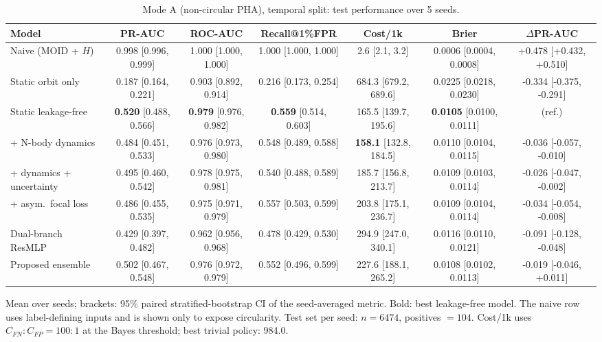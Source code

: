 \begin{table}[t]
\centering
\small
\caption{Mode A (non-circular PHA), temporal split: test performance over 5 seeds.}
\label{tab:pha_temporal_all}
\begin{tabular}{lcccccc}
\toprule
Model & PR-AUC & ROC-AUC & Recall@1\%FPR & Cost/1k & Brier & $\Delta$PR-AUC \\
\midrule
Naive (MOID + $H$) & 0.998 \scriptsize{[0.996, 0.999]} & 1.000 \scriptsize{[1.000, 1.000]} & 1.000 \scriptsize{[1.000, 1.000]} & 2.6 \scriptsize{[2.1, 3.2]} & 0.0006 \scriptsize{[0.0004, 0.0008]} & +0.478 \scriptsize{[+0.432, +0.510]} \\
\midrule
Static orbit only & 0.187 \scriptsize{[0.164, 0.221]} & 0.903 \scriptsize{[0.892, 0.914]} & 0.216 \scriptsize{[0.173, 0.254]} & 684.3 \scriptsize{[679.2, 689.6]} & 0.0225 \scriptsize{[0.0218, 0.0230]} & -0.334 \scriptsize{[-0.375, -0.291]} \\
Static leakage-free & \textbf{0.520} \scriptsize{[0.488, 0.566]} & \textbf{0.979} \scriptsize{[0.976, 0.982]} & \textbf{0.559} \scriptsize{[0.514, 0.603]} & 165.5 \scriptsize{[139.7, 195.6]} & \textbf{0.0105} \scriptsize{[0.0100, 0.0111]} & (ref.) \\
+ N-body dynamics & 0.484 \scriptsize{[0.451, 0.533]} & 0.976 \scriptsize{[0.973, 0.980]} & 0.548 \scriptsize{[0.489, 0.588]} & \textbf{158.1} \scriptsize{[132.8, 184.5]} & 0.0110 \scriptsize{[0.0104, 0.0115]} & -0.036 \scriptsize{[-0.057, -0.010]} \\
+ dynamics + uncertainty & 0.495 \scriptsize{[0.460, 0.542]} & 0.978 \scriptsize{[0.975, 0.981]} & 0.540 \scriptsize{[0.488, 0.589]} & 185.7 \scriptsize{[156.8, 213.7]} & 0.0109 \scriptsize{[0.0103, 0.0114]} & -0.026 \scriptsize{[-0.047, -0.002]} \\
+ asym.\ focal loss & 0.486 \scriptsize{[0.455, 0.535]} & 0.975 \scriptsize{[0.971, 0.979]} & 0.557 \scriptsize{[0.503, 0.599]} & 203.8 \scriptsize{[175.1, 236.7]} & 0.0109 \scriptsize{[0.0104, 0.0114]} & -0.034 \scriptsize{[-0.054, -0.008]} \\
Dual-branch ResMLP & 0.429 \scriptsize{[0.397, 0.482]} & 0.962 \scriptsize{[0.956, 0.968]} & 0.478 \scriptsize{[0.429, 0.530]} & 294.9 \scriptsize{[247.0, 340.1]} & 0.0116 \scriptsize{[0.0110, 0.0121]} & -0.091 \scriptsize{[-0.128, -0.048]} \\
Proposed ensemble & 0.502 \scriptsize{[0.467, 0.548]} & 0.976 \scriptsize{[0.972, 0.979]} & 0.552 \scriptsize{[0.496, 0.599]} & 227.6 \scriptsize{[188.1, 265.2]} & 0.0108 \scriptsize{[0.0102, 0.0113]} & -0.019 \scriptsize{[-0.046, +0.011]} \\
\bottomrule
\end{tabular}
\par\vspace{2pt}\footnotesize Mean over seeds; brackets: 95\% paired stratified-bootstrap CI of the seed-averaged metric. Bold: best leakage-free model. The naive row uses label-defining inputs and is shown only to expose circularity. Test set per seed: $n=6474$, positives $=104$. Cost/1k uses $C_{FN}{:}C_{FP}=100{:}1$ at the Bayes threshold; best trivial policy: 984.0.
\end{table}
